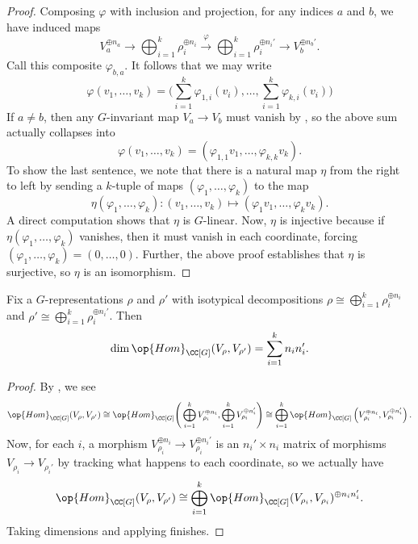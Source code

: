\documentclass{article}
\begin{document}
\begin{proof}
	Composing $\varphi$ with inclusion and projection, for any indices $a$ and $b$, we have induced maps
	\[V_a^{\oplus n_a}\to\bigoplus_{i=1}^k\rho_i^{\oplus n_i}\stackrel\varphi\to\bigoplus_{i=1}^k\rho_i^{\oplus n_i'}\to V_b^{\oplus n_b'}.\]
	Call this composite $\varphi_{b,a}$. It follows that we may write
	\[\varphi(v_1,\ldots,v_k)=\Bigg(\sum_{i=1}^k\varphi_{1,i}(v_i),\ldots,\sum_{i=1}^k\varphi_{k,i}(v_i)\Bigg)\]
	If $a\ne b$, then any $G$-invariant map $V_a\to V_b$ must vanish by , so the above sum actually collapses into
	\[\varphi(v_1,\ldots,v_k)=(\varphi_{1,1}v_1,\ldots,\varphi_{k,k}v_k).\]
	To show the last sentence, we note that there is a natural map $\eta$ from the right to left by sending a $k$-tuple of maps $(\varphi_1,\ldots,\varphi_k)$ to the map
	\[\eta(\varphi_1,\ldots,\varphi_k)\colon(v_1,\ldots,v_k)\mapsto(\varphi_1v_1,\ldots,\varphi_kv_k).\]
	A direct computation shows that $\eta$ is $G$-linear. Now, $\eta$ is injective because if $\eta(\varphi_1,\ldots,\varphi_k)$ vanishes, then it must vanish in each coordinate, forcing $(\varphi_1,\ldots,\varphi_k)=(0,\ldots,0)$. Further, the above proof establishes that $\eta$ is surjective, so $\eta$ is an isomorphism.
\end{proof}
\begin{corollary} \label{cor:bilin-hom-form}
	Fix a $G$-representations $\rho$ and $\rho'$ with isotypical decompositions $\rho\cong\bigoplus_{i=1}^k\rho_i^{\oplus n_i}$ and $\rho'\cong\bigoplus_{i=1}^k\rho_i^{\oplus n_i'}$. Then
	\[\dim\op{Hom}_{\CC[G]}(V_\rho,V_{\rho'})=\sum_{i=1}^kn_in_i'.\]
\end{corollary}
\begin{proof}
	By , we see
	\[\op{Hom}_{\CC[G]}(V_\rho,V_{\rho'})\cong\op{Hom}_{\CC[G]}\Bigg(\bigoplus_{i=1}^kV_{\rho_i}^{\oplus n_i},\bigoplus_{i=1}^kV_{\rho_i}^{\oplus n_i'}\Bigg)\cong\bigoplus_{i=1}^k\op{Hom}_{\CC[G]}\left(V_{\rho_i}^{\oplus n_i},V_{\rho_i}^{\oplus n_i'}\right).\]
	Now, for each $i$, a morphism $V_{\rho_i}^{\oplus n_i}\to V_{\rho_i}^{\oplus n_i'}$ is an $n_i'\times n_i$ matrix of morphisms $V_{\rho_i}\to V_{\rho_i'}$ by tracking what happens to each coordinate, so we actually have
	\[\op{Hom}_{\CC[G]}(V_\rho,V_{\rho'})\cong\bigoplus_{i=1}^k\op{Hom}_{\CC[G]}(V_{\rho_i},V_{\rho_i})^{\oplus n_in_i'}.\]
	Taking dimensions and applying  finishes.
\end{proof}
\end{document}
